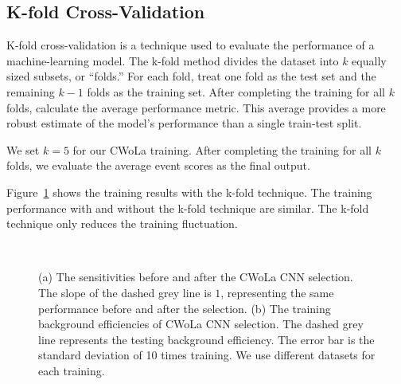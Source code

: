 \documentclass[12pt]{article}
\begin{document}
    \subsection{K-fold Cross-Validation}%
    \label{sub:k_fold_cross_validation}
        K-fold cross-validation is a technique used to evaluate the performance of a machine-learning model. The k-fold method divides the dataset into $k$ equally sized subsets, or ``folds.'' For each fold, treat one fold as the test set and the remaining $k - 1$ folds as the training set. After completing the training for all $k$ folds, calculate the average performance metric. This average provides a more robust estimate of the model's performance than a single train-test split.

        We set $k=5$ for our CWoLa training. After completing the training for all $k$ folds, we evaluate the average event scores as the final output.

        Figure~\ref{fig:sensitivity_improvement_background_pass_rate_k_fold} shows the training results with the k-fold technique. The training performance with and without the k-fold technique are similar. The k-fold technique only reduces the training fluctuation.
        \begin{figure}[htpb]
            \centering
             \\
            \caption{(a) The sensitivities before and after the CWoLa CNN selection. The slope of the dashed grey line is $1$, representing the same performance before and after the selection. (b) The training background efficiencies of CWoLa CNN selection. The dashed grey line represents the testing background efficiency. The error bar is the standard deviation of 10 times training. We use different datasets for each training.}
            \label{fig:sensitivity_improvement_background_pass_rate_k_fold}
        \end{figure}
\end{document}
